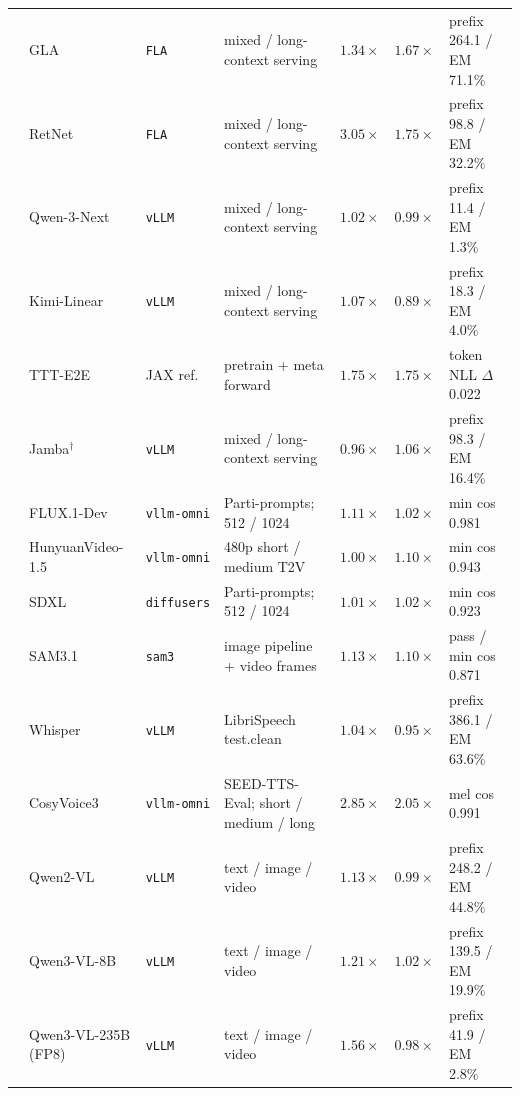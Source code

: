 \begin{table}[H]
{\begin{tabular}{@{}ll>{\raggedright\arraybackslash}p{1.55cm}>{\raggedright\arraybackslash}p{2.6cm}cc>{\raggedright\arraybackslash}p{2.35cm}@{}}
       & GLA & \texttt{FLA} & mixed / long-context serving & $1.34\times$ & $1.67\times$ & prefix 264.1 / EM 71.1\% \\
       & RetNet & \texttt{FLA} & mixed / long-context serving & $3.05\times$ & $1.75\times$ & prefix 98.8 / EM 32.2\% \\
       & Qwen-3-Next & \texttt{vLLM} & mixed / long-context serving & $1.02\times$ & $0.99\times$ & prefix 11.4 / EM 1.3\% \\
       & Kimi-Linear & \texttt{vLLM} & mixed / long-context serving & $1.07\times$ & $0.89\times$ & prefix 18.3 / EM 4.0\% \\
       & TTT-E2E & JAX ref. & pretrain + meta forward & $1.75\times$ & $1.75\times$ & token NLL $\Delta$ 0.022 \\
       & Jamba$^\dagger$ & \texttt{vLLM} & mixed / long-context serving & $0.96\times$ & $1.06\times$ & prefix 98.3 / EM 16.4\% \\
      \midrule
       & FLUX.1-Dev & \texttt{vllm-omni} & Parti-prompts; 512 / 1024 & $1.11\times$ & $1.02\times$ & min cos 0.981 \\
       & HunyuanVideo-1.5 & \texttt{vllm-omni} & 480p short / medium T2V & $1.00\times$ & $1.10\times$ & min cos 0.943 \\
       & SDXL & \texttt{diffusers} & Parti-prompts; 512 / 1024 & $1.01\times$ & $1.02\times$ & min cos 0.923 \\
       & SAM3.1 & \texttt{sam3} & image pipeline + video frames & $1.13\times$ & $1.10\times$ & pass / min cos 0.871 \\
       & Whisper & \texttt{vLLM} & LibriSpeech test.clean & $1.04\times$ & $0.95\times$ & prefix 386.1 / EM 63.6\% \\
       & CosyVoice3 & \texttt{vllm-omni} & SEED-TTS-Eval; short / medium / long & $2.85\times$ & $2.05\times$ & mel cos 0.991 \\
      \midrule
       & Qwen2-VL & \texttt{vLLM} & text / image / video & $1.13\times$ & $0.99\times$ & prefix 248.2 / EM 44.8\% \\
       & Qwen3-VL-8B & \texttt{vLLM} & text / image / video & $1.21\times$ & $1.02\times$ & prefix 139.5 / EM 19.9\% \\
       & Qwen3-VL-235B (FP8) & \texttt{vLLM} & text / image / video & $1.56\times$ & $0.98\times$ & prefix 41.9 / EM 2.8\% \\

\end{tabular}}
\end{table}
